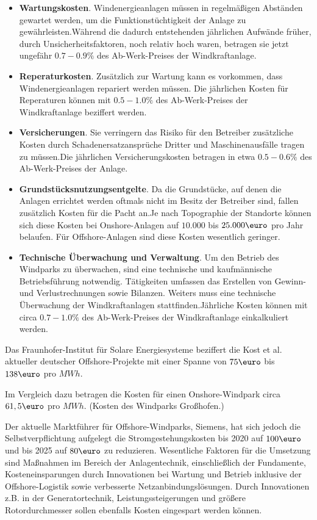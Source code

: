 \documentclass[a4paper,12pt]{article}
\begin{document}
	\begin{itemize}
		\item \textbf{Wartungskosten}. Windenergieanlagen müssen in regelmäßigen Abständen gewartet werden, um die Funktionstüchtigkeit der Anlage zu gewährleisten.\newline Während die dadurch entstehenden jährlichen Aufwände früher, durch Unsicherheitsfaktoren, noch relativ hoch waren, betragen sie jetzt ungefähr $0.7 - 0.9\%$ des Ab-Werk-Preises der Windkraftanlage.
		\item \textbf{Reperaturkosten}. Zusätzlich zur Wartung kann es vorkommen, dass Windenergieanlagen repariert werden müssen.\newline
		Die jährlichen Kosten für Reperaturen können mit $0.5 - 1.0\%$ des Ab-Werk-Preises der Windkraftanlage beziffert werden.
		\item \textbf{Versicherungen}. Sie verringern das Risiko für den Betreiber zusätzliche Kosten durch Schadenersatzansprüche Dritter und Maschinenausfälle tragen zu müssen.\newline Die jährlichen Versicherungskosten betragen in etwa $0.5 - 0.6\%$ des Ab-Werk-Preises der Anlage.
		\item \textbf{Grundstücksnutzungsentgelte}. Da die Grundstücke, auf denen die Anlagen errichtet werden oftmals nicht im Besitz der Betreiber sind, fallen zusätzlich Kosten für die Pacht an.\newline Je nach Topographie der Standorte können sich diese Kosten bei Onshore-Anlagen auf $10.000$ bis $25.000\mbox{\euro}$ pro Jahr belaufen. Für Offshore-Anlagen sind diese Kosten wesentlich geringer.
		\item \textbf{Technische Überwachung und Verwaltung}. Um den Betrieb des Windparks zu überwachen, sind eine technische und kaufmännische Betriebsführung notwendig. Tätigkeiten umfassen das Erstellen von Gewinn- und Verlustrechnungen sowie Bilanzen. Weiters muss eine technische Überwachung der Windkraftanlagen stattfinden.\newline Jährliche Kosten können mit circa $0.7 - 1.0\%$ des Ab-Werk-Preises der Windkraftanlage einkalkuliert werden.
	\end{itemize}
	Das Fraunhofer-Institut für Solare Energiesysteme beziffert die Kost et al. aktueller deutscher Offshore-Projekte mit einer Spanne von $75\mbox{\euro}$ bis $138\mbox{\euro}$ pro $MWh$.\\ \par
	\noindent Im Vergleich dazu betragen die Kosten für einen Onshore-Windpark circa $61,5\mbox{\euro}$ pro $MWh$. (Kosten des Windparks Großhofen.)\\ \par
	\noindent Der aktuelle Marktführer für Offshore-Windparks, Siemens, hat sich jedoch die Selbstverpflichtung aufgelegt die Stromgestehungskosten bis 2020 auf $100\mbox{\euro}$ und bis 2025 auf $80\mbox{\euro}$ zu reduzieren. Wesentliche Faktoren für die Umsetzung sind Maßnahmen im Bereich der Anlagentechnik, einschließlich der Fundamente, Kosteneinsparungen durch Innovationen bei Wartung und Betrieb inklusive der Offshore-Logistik sowie verbesserte Netzanbindungslösungen. Durch Innovationen z.B. in der Generatortechnik, Leistungssteigerungen und größere Rotordurchmesser sollen ebenfalls Kosten eingespart werden können.
\end{document}
